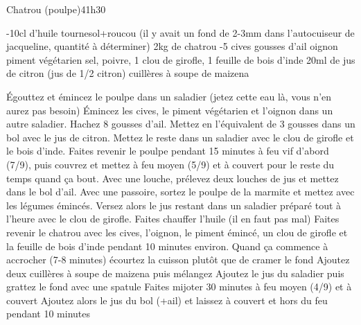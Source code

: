 {\renewcommand{\section}[1]{}

\section{Chatrou (poulpe)}
\begin{recette}{Chatrou (poulpe)}{4}{1h30}{}
\begin{ingredients}
-10cl d'huile tournesol+roucou (il y avait un fond de 2-3mm dans l'autocuiseur de jacqueline, quantité à déterminer)
\ingredient 2kg de chatrou
-5 cives
 gousses d'ail
 oignon
 piment végétarien
\ingredient sel, poivre, 1 clou de girofle, 1 feuille de bois d'inde
\ingredient 20ml de jus de citron (jus de 1/2 citron)
 cuillères à soupe de maizena
\end{ingredients}

\begin{preparation}
\etape Égouttez et émincez le poulpe dans un saladier (jetez cette eau là, vous n'en aurez pas besoin)
\etape Émincez les cives, le piment végétarien et l'oignon dans un autre saladier.
\etape Hachez 8 gousses d'ail. Mettez en l'équivalent de 3 gousses dans un bol avec le jus de citron. Mettez le reste dans un saladier avec le clou de girofle et le bois d'inde.
\etape Faites revenir le poulpe pendant 15 minutes à feu vif d'abord (7/9), puis couvrez et mettez à feu moyen (5/9) et à couvert pour le reste du temps quand ça bout. 
\etape Avec une louche, prélevez deux louches de jus et mettez dans le bol d'ail. Avec une passoire, sortez le poulpe de la marmite et mettez avec les légumes émincés. Versez alors le jus restant dans un saladier préparé tout à l'heure avec le clou de girofle.
\etape Faites chauffer l'huile (il en faut pas mal)
\etape Faites revenir le chatrou avec les cives, l'oignon, le piment émincé, un clou de girofle et la feuille de bois d'inde pendant 10 minutes environ. Quand ça commence à accrocher (7-8 minutes) écourtez la cuisson plutôt que de cramer le fond
\etape Ajoutez deux cuillères à soupe de maizena puis mélangez
\etape Ajoutez le jus du saladier puis grattez le fond avec une spatule
\etape Faites mijoter 30 minutes à feu moyen (4/9) et à couvert
\etape Ajoutez alors le jus du bol (+ail) et laissez à couvert et hors du feu pendant 10 minutes
\end{preparation}
\end{recette}


}
